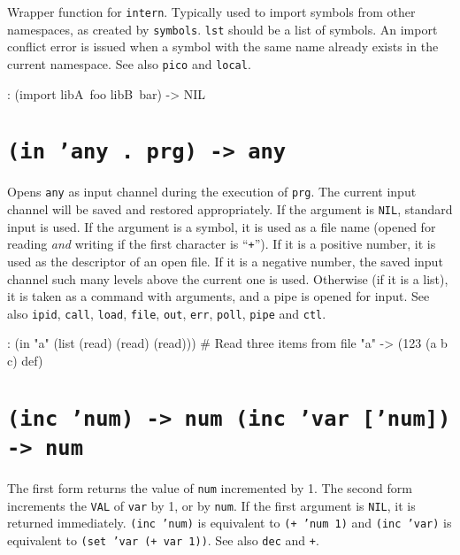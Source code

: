 Wrapper function for \texttt{intern}. Typically used to import symbols from
other namespaces, as created by \texttt{symbols}. \texttt{lst} should be a list of
symbols. An import conflict error is issued when a symbol with the same
name already exists in the current namespace. See also \texttt{pico} and
\texttt{local}.


\begin{wideverbatim}
: (import libA~foo libB~bar)
-> NIL
\end{wideverbatim}

 
\section*{\texttt{(in 'any . prg) -> any}}
\label{sec:func-ref-I-(in 'any . prg) -> any}


Opens \texttt{any} as input channel during the execution of \texttt{prg}. The current
input channel will be saved and restored appropriately. If the argument
is \texttt{NIL}, standard input is used. If the argument is a symbol, it is
used as a file name (opened for reading \emph{and} writing if the first
character is ``\texttt{+}''). If it is a positive number, it is used as the
descriptor of an open file. If it is a negative number, the saved input
channel such many levels above the current one is used. Otherwise (if it
is a list), it is taken as a command with arguments, and a pipe is
opened for input. See also \texttt{ipid}, \texttt{call}, \texttt{load}, \texttt{file}, \texttt{out}, \texttt{err},
\texttt{poll}, \texttt{pipe} and \texttt{ctl}.


\begin{wideverbatim}
: (in "a" (list (read) (read) (read)))  # Read three items from file "a"
-> (123 (a b c) def)
\end{wideverbatim}

 
\section*{\texttt{(inc 'num) -> num (inc 'var ['num]) -> num}}
\label{sec:func-ref-I-(inc 'num) -> num (inc 'var ['num]) -> num}


The first form returns the value of \texttt{num} incremented by 1. The second
form increments the \texttt{VAL} of \texttt{var} by 1, or by \texttt{num}. If the first
argument is \texttt{NIL}, it is returned immediately. \texttt{(inc 'num)} is
equivalent to \texttt{(+ 'num 1)} and \texttt{(inc 'var)} is equivalent to
\texttt{(set 'var (+ var 1))}. See also \texttt{dec} and \texttt{+}.


